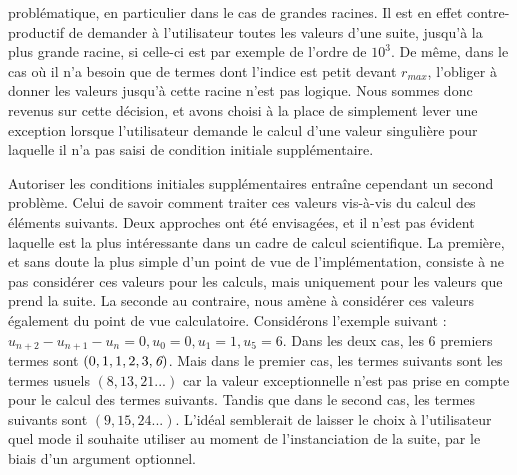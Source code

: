 \documentclass[12pt]{article}
\begin{document}
        problématique, en particulier dans le cas de grandes racines. Il est en effet
        contre-productif de demander à l'utilisateur toutes les valeurs d'une suite,
        jusqu'à la plus grande racine, si celle-ci est par exemple de l'ordre de $10^3$.
        De même, dans le cas où il n'a besoin que de termes dont l'indice est petit devant
        $r_{max}$, l'obliger à donner les valeurs jusqu'à cette racine n'est pas logique.
        Nous sommes donc revenus sur cette décision, et avons choisi à la place de simplement
        lever une exception lorsque l'utilisateur demande le calcul d'une valeur singulière
        pour laquelle il n'a pas saisi de condition initiale supplémentaire.\\
        \par Autoriser les conditions initiales supplémentaires entraîne cependant un second
        problème. Celui de savoir comment traiter ces valeurs vis-à-vis du calcul des
        éléments suivants. Deux approches ont été envisagées, et il n'est pas évident
        laquelle est la plus intéressante dans un cadre de calcul scientifique.
        La première, et sans doute la plus simple d'un point de vue de l'implémentation,
        consiste à ne pas considérer ces valeurs pour les calculs, mais uniquement
        pour les valeurs que prend la suite. La seconde au contraire, nous amène à considérer
        ces valeurs également du point de vue calculatoire. Considérons l'exemple suivant :
        $u_{n+2} - u_{n+1} - u_n = 0, u_0=0, u_1=1, u_5=6$. Dans les deux cas, les 6 premiers
        termes sont $(0,1,1,2,3,\emph{6})$. Mais dans le premier cas, les termes suivants sont
        les termes usuels $(8,13,21...)$ car la valeur exceptionnelle n'est pas prise en
        compte pour le calcul des termes suivants. Tandis que dans le second cas, les termes
        suivants sont $(9,15,24...)$. L'idéal semblerait de laisser le choix à l'utilisateur
        quel mode il souhaite utiliser au moment de l'instanciation de la suite, par le biais
        d'un argument optionnel.
\end{document}
